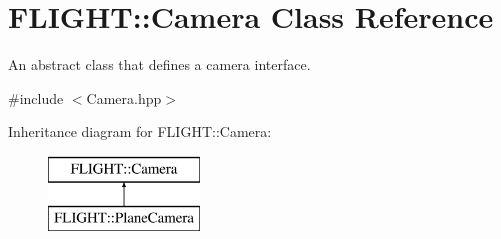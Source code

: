 \hypertarget{class_f_l_i_g_h_t_1_1_camera}{}\section{F\+L\+I\+G\+HT\+:\+:Camera Class Reference}
\label{class_f_l_i_g_h_t_1_1_camera}


An abstract class that defines a camera interface.  




{\ttfamily \#include $<$Camera.\+hpp$>$}

Inheritance diagram for F\+L\+I\+G\+HT\+:\+:Camera\+:\begin{figure}[H]
\begin{center}
\leavevmode
\includegraphics[height=2.000000cm]{class_f_l_i_g_h_t_1_1_camera}
\end{center}
\end{figure}
